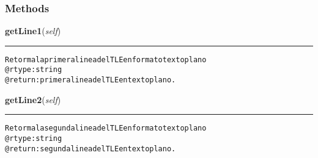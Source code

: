   \subsubsection{Methods}

    \label{GroundSegment:models:Tle:Tle:getLine1}

    \vspace{0.5ex}

\hspace{.8\funcindent}\begin{boxedminipage}{\funcwidth}

    \raggedright \textbf{getLine1}(\textit{self})

    \vspace{-1.5ex}

    \rule{\textwidth}{0.5\fboxrule}
\setlength{\parskip}{2ex}
\begin{alltt}

Retorma la primera linea del TLE en formato texto plano
@rtype:   string
@return:  primera linea del TLE en texto plano.
\end{alltt}

\setlength{\parskip}{1ex}
    \end{boxedminipage}

    \label{GroundSegment:models:Tle:Tle:getLine2}

    \vspace{0.5ex}

\hspace{.8\funcindent}\begin{boxedminipage}{\funcwidth}

    \raggedright \textbf{getLine2}(\textit{self})

    \vspace{-1.5ex}

    \rule{\textwidth}{0.5\fboxrule}
\setlength{\parskip}{2ex}
\begin{alltt}

Retorma la segunda linea del TLE en formato texto plano
@rtype:   string
@return:  segunda linea del TLE en texto plano.
\end{alltt}

\setlength{\parskip}{1ex}
    \end{boxedminipage}




